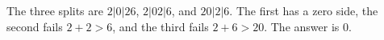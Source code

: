 The three splits are $2|0|26$, $2|02|6$, and $20|2|6$. The first has a zero side, the second fails $2+2>6$, and the third fails $2+6>20$. The answer is $\boxed0$.
